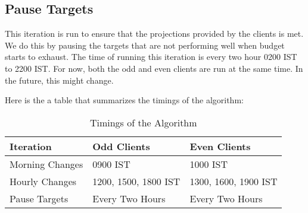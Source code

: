 \subsection{Pause Targets}

This iteration is run to ensure that the projections provided by the clients is met. We do this by pausing the targets that are not performing well when budget starts to exhaust. The time of running this iteration is every two hour 0200 IST to 2200 IST. For now, both the odd and even clients are run at the same time. In the future, this might change.

Here is the a table that summarizes the timings of the algorithm:

\begin{table}[h]
    \centering
    \begin{tabular}{|l|l|l|}
        \hline
        \textbf{Iteration} & \textbf{Odd Clients} & \textbf{Even Clients} \\ \hline
        Morning Changes    & 0900 IST             & 1000 IST              \\ \hline
        Hourly Changes     & 1200, 1500, 1800 IST & 1300, 1600, 1900 IST  \\ \hline
        Pause Targets      & Every Two Hours      & Every Two Hours       \\ \hline
    \end{tabular}
    \caption{Timings of the Algorithm}
    \label{tab:timings}
\end{table}